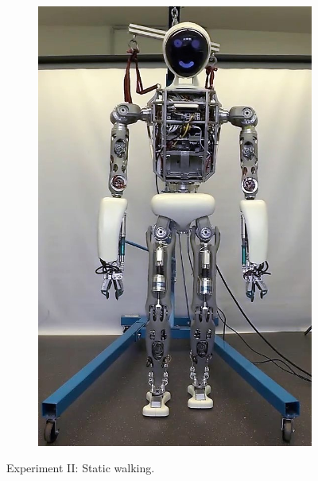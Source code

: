 \begin{figure}[h!]
\begin{subfigure}{.2\textwidth}
	\includegraphics[width=.95\linewidth]{experiments/walkStatic/snaps/5}
	\end{subfigure}%
\caption[Experiment II: Static walking]{Experiment II: Static walking.}
\label{exp:staticWalkingSnaps}
\end{figure} 

